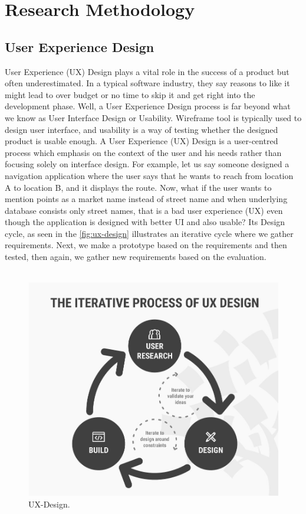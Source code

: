 \chapter{Research Methodology}
\label{ch:researchmethodology_report}

\section{User Experience Design} 
\label{sec:uxd}

User Experience (UX) Design plays a vital role in the success of a product but often underestimated. In a typical software industry, they say reasons to like it might lead to over budget or no time to skip it and get right into the development phase. Well, a User Experience Design process is far beyond what we know as User Interface Design or Usability. Wireframe tool is typically used to design user interface, and usability is a way of testing whether the designed product is usable enough. A User Experience (UX) Design is a user-centred process which emphasis on the context of the user and his needs rather than focusing solely on interface design. \cite{UX} For example, let us say someone designed a navigation application where the user says that he wants to reach from location A to location B, and it displays the route. Now, what if the user wants to mention points as a market name instead of street name and when underlying database consists only street names, that is a bad user experience (UX) even though the application is designed with better UI and also usable? Its Design \cite{UXD} cycle, as seen in the \autoref{fig:ux-design} illustrates an iterative cycle where we gather requirements. Next, we make a prototype based on the requirements and then tested, then again, we gather new requirements based on the evaluation. \\ \\


\begin{figure}[hbt!]
	\centering
	\includegraphics[width=\linewidth]{figures/ux-design}
	\caption{UX-Design.\cite{UXD}}
	\label{fig:ux-design}
\end{figure}

